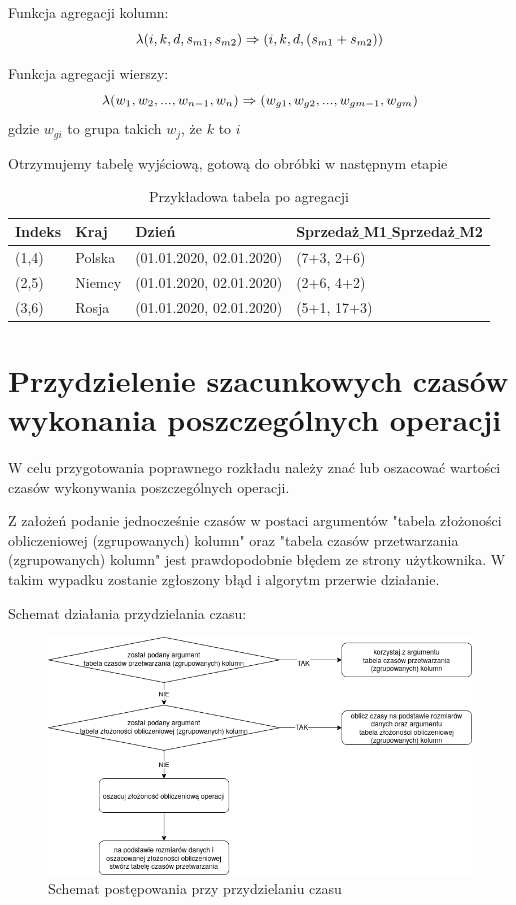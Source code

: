 \documentclass[brudnopis]{xmgr}
\begin{document}
Funkcja agregacji kolumn:
$$\lambda (i, k, d, s_{m1}, s_{m2}) \\ \Rightarrow (i, k, d, (s_{m1}+s_{m2}))$$

Funkcja agregacji wierszy:
$$\lambda (w_1, w_2, ..., w_{n-1}, w_n) \\ \Rightarrow (w_{g1}, w_{g2}, ..., w_{gm-1}, w_{gm})$$
gdzie $w_{gi}$ to grupa takich $w_j$, że $k$ to $i$

Otrzymujemy tabelę wyjściową, gotową do obróbki w następnym etapie

\begin{table}[!tbh]
\begin{tabular}{|l|l|l|l|} \hline
Indeks & Kraj & Dzień & Sprzedaż$\_$M1$\_$Sprzedaż$\_$M2 \\ \hline
(1,4) & Polska & (01.01.2020, 02.01.2020) & (7+3, 2+6) \\ \hline
(2,5) & Niemcy & (01.01.2020, 02.01.2020) & (2+6, 4+2) \\ \hline
(3,6) & Rosja & (01.01.2020, 02.01.2020) & (5+1, 17+3) \\ \hline
\end{tabular}
\caption{Przykładowa tabela po agregacji\label{tab:example-output}}
\end{table}


\newpage
\section{Przydzielenie szacunkowych czasów wykonania poszczególnych operacji}

W celu przygotowania poprawnego rozkładu należy znać lub oszacować wartości czasów wykonywania poszczególnych operacji.

Z założeń podanie jednocześnie czasów w postaci argumentów "tabela złożoności obliczeniowej (zgrupowanych) kolumn" oraz "tabela czasów przetwarzania (zgrupowanych) kolumn" jest prawdopodobnie błędem ze strony użytkownika. W takim wypadku zostanie zgłoszony błąd i algorytm przerwie działanie.

Schemat działania przydzielania czasu:

\begin{figure}[!tbh]
\centering
\includegraphics[width=.8\hsize]{fig/przydzielanie_czasow.png}
\caption{Schemat postępowania przy przydzielaniu czasu\label{RYS.2}}
\end{figure}
\end{document}
